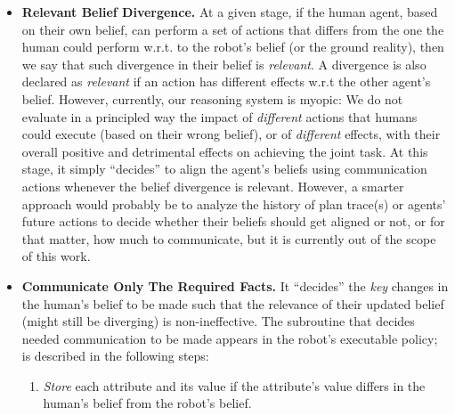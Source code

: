 \documentclass[letterpaper]{article} %
\begin{document}


\begin{itemize}
    \item \textbf{Relevant Belief Divergence.}
    At a given stage, if the human agent, based on their own belief, can perform a set of actions that differs from 
    the one 
    the human could perform w.r.t. to the robot's belief (or the ground reality), then we say that such divergence in their belief is \textit{relevant}.
    A divergence is also declared as \textit{relevant} if an action has different effects w.r.t the other agent's belief.
    However, currently, our reasoning system is myopic: We do not evaluate in a principled way the impact of \textit{different} actions that humans could execute (based on their wrong belief), or of \textit{different} effects, with their overall positive and detrimental effects on achieving the joint task. At this stage, it simply ``decides'' to align the agent's beliefs using communication actions whenever the belief divergence is relevant.
    However, a smarter approach would probably be to analyze the history of plan trace(s) or agents' future actions to decide whether their beliefs should get aligned or not, or for that matter, how much to communicate, but it is currently out of the scope of this work. 
    
    \item \textbf{Communicate Only The Required Facts.}
    It ``decides'' the \textit{key} changes in the human's belief to be made such that the relevance of their updated belief (might still be diverging) is non-ineffective. 
    The subroutine that decides needed 
    communication to be made appears in the robot's executable policy; is described in the following steps:
    \begin{enumerate}
        \item 
        \textit{Store} each attribute and its value if the attribute's value differs in the human's belief from the robot's belief. 
    

\end{enumerate}
\end{itemize}
\end{document}
